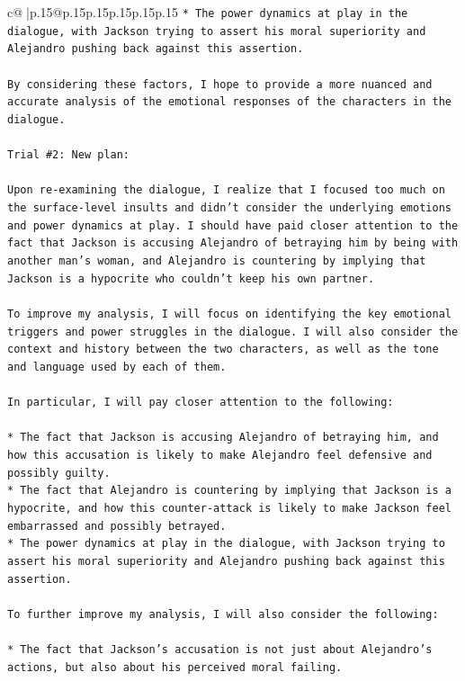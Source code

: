 \documentclass{article}
\begin{document}
{\begin{supertabular}{c@{$\;$}|p{.15\linewidth}@{}p{.15\linewidth}p{.15\linewidth}p{.15\linewidth}p{.15\linewidth}p{.15\linewidth}}
{{{\texttt{* The power dynamics at play in the dialogue, with Jackson trying to assert his moral superiority and Alejandro pushing back against this assertion.} \\
\\ 
\texttt{By considering these factors, I hope to provide a more nuanced and accurate analysis of the emotional responses of the characters in the dialogue.} \\
\\ 
\texttt{Trial \#2: New plan: } \\
\\ 
\texttt{Upon re{-}examining the dialogue, I realize that I focused too much on the surface{-}level insults and didn't consider the underlying emotions and power dynamics at play. I should have paid closer attention to the fact that Jackson is accusing Alejandro of betraying him by being with another man's woman, and Alejandro is countering by implying that Jackson is a hypocrite who couldn't keep his own partner.} \\
\\ 
\texttt{To improve my analysis, I will focus on identifying the key emotional triggers and power struggles in the dialogue. I will also consider the context and history between the two characters, as well as the tone and language used by each of them.} \\
\\ 
\texttt{In particular, I will pay closer attention to the following:} \\
\\ 
\texttt{* The fact that Jackson is accusing Alejandro of betraying him, and how this accusation is likely to make Alejandro feel defensive and possibly guilty.} \\
\texttt{* The fact that Alejandro is countering by implying that Jackson is a hypocrite, and how this counter{-}attack is likely to make Jackson feel embarrassed and possibly betrayed.} \\
\texttt{* The power dynamics at play in the dialogue, with Jackson trying to assert his moral superiority and Alejandro pushing back against this assertion.} \\
\\ 
\texttt{To further improve my analysis, I will also consider the following:} \\
\\ 
\texttt{* The fact that Jackson's accusation is not just about Alejandro's actions, but also about his perceived moral failing.} \\
}}}
\end{supertabular}}
\end{document}
